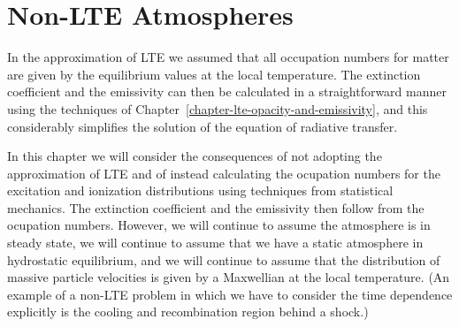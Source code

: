 
\chapter{Non-LTE Atmospheres}


%


In the approximation of LTE we assumed that all occupation numbers for
matter are given by the equilibrium values at the local temperature. The
extinction coefficient and the emissivity can then be calculated in a
straightforward manner using the techniques of
Chapter~\ref{chapter-lte-opacity-and-emissivity}, and this considerably
simplifies the solution of the equation of radiative transfer.

In this chapter we will consider the consequences of not adopting the
approximation of LTE and of instead calculating the ocupation numbers
for the excitation and ionization distributions using techniques from
statistical mechanics. The extinction coefficient and the emissivity
then follow from the ocupation numbers. However, we will continue to
assume the atmosphere is in steady state, we will continue to assume
that we have a static atmosphere in hydrostatic equilibrium, and we will
continue to assume that the distribution of massive particle velocities
is given by a Maxwellian at the local temperature. (An example of a
non-LTE problem in which we have to consider the time dependence
explicitly is the cooling and recombination region behind a
shock.)

